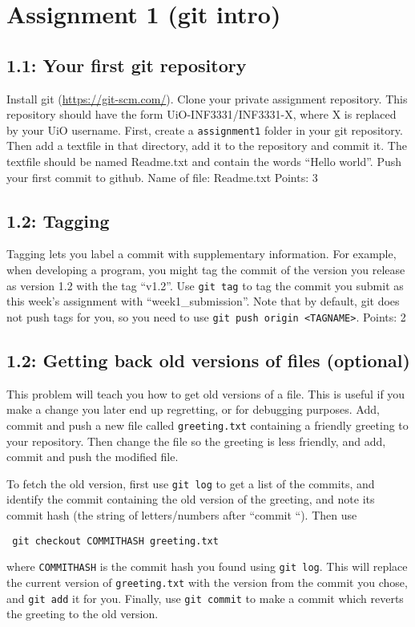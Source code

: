 \documentclass[english]{article}
\begin{document}
\section{Assignment 1 (git intro)}

\subsection{1.1: Your first git repository}
Install git (\url{https://git-scm.com/}). Clone your private assignment repository. This repository should have the form UiO-INF3331/INF3331-{X}, where {X} is replaced by your UiO username. First, create a \texttt{assignment1} folder in your git repository. Then add a textfile in that directory, add it to the repository and commit it. The textfile should be named Readme.txt and contain the words ``Hello world''. Push your first commit to github.
\newline
\newline
Name of file: Readme.txt
\newline
Points: 3

\subsection{1.2: Tagging}
Tagging lets you label a commit with supplementary information. For example, when developing a program, you might tag the commit of the version you release as version 1.2 with the tag ``v1.2''. Use \texttt{git tag} to tag the commit you submit as this week's assignment with ``week1\_submission''. Note that by default, git does not push tags for you, so you need to use \texttt{git push origin <TAGNAME>}.
\newline
Points: 2


\subsection{1.2: Getting back old versions of files (optional)}
This problem will teach you how to get old versions of a file. This is useful if you make a change you later end up regretting, or for debugging purposes. Add, commit and push a new file called \texttt{greeting.txt} containing a friendly greeting to your repository. Then change the file so the greeting is less friendly, and add, commit and push the modified file.

To fetch the old version, first use \texttt{git log} to get a list of the commits, and identify the commit containing the old version of the greeting, and note its commit hash (the string of letters/numbers after ``commit ``). Then use
\begin{center}
\texttt{  git checkout COMMITHASH greeting.txt}
\end{center}
where \texttt{COMMITHASH} is the commit hash you found using \texttt{git log}. This will replace the current version of \texttt{greeting.txt} with the version from the commit you chose, and \texttt{git add} it for you. Finally, use \texttt{git commit} to make a commit which reverts the greeting to the old version.
\end{document}
